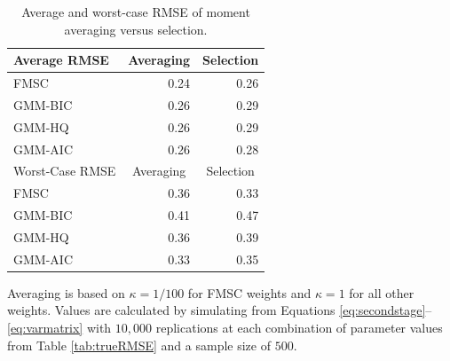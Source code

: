 \documentclass[12pt]{article}
\theoremstyle{definition}
\begin{document}
%
\begin{table}[!tbp]
 \begin{center}
\caption{Average and worst-case RMSE of moment averaging versus selection.}
\label{tab:avg}
\small
 \begin{tabular}{lrr}\hline\hline
\multicolumn{1}{l}{Average RMSE}&\multicolumn{1}{c}{Averaging}&\multicolumn{1}{c}{Selection}\tabularnewline
\hline
FMSC&0.24&0.26\tabularnewline
GMM-BIC&0.26&0.29\tabularnewline
GMM-HQ&0.26&0.29\tabularnewline
GMM-AIC&0.26&0.28\tabularnewline
\hline
\multicolumn{1}{l}{Worst-Case RMSE}&\multicolumn{1}{c}{Averaging}&\multicolumn{1}{c}{Selection}\tabularnewline
\hline
FMSC&0.36&0.33\tabularnewline
GMM-BIC&0.41&0.47\tabularnewline
GMM-HQ&0.36&0.39\tabularnewline
GMM-AIC&0.33&0.35\tabularnewline
\hline
\end{tabular}
\end{center}
\footnotesize
\begin{tablenotes}
	\item  Averaging is based on $\kappa = 1/100$ for FMSC weights and $\kappa = 1$ for all other weights. Values are calculated by simulating from Equations \ref{eq:secondstage}--\ref{eq:varmatrix} with $10,000$ replications at each combination of parameter values from Table \ref{tab:trueRMSE} and a sample size of $500$.
\end{tablenotes}
\end{table}
\end{document}

